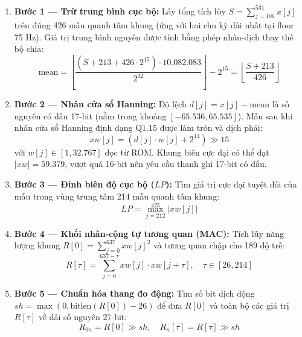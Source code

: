 \begin{enumerate}[leftmargin=1.5em, itemsep=3pt]
    \item \textbf{Bước 1 --- Trừ trung bình cục bộ:} Lấy tổng tích lũy $S = \sum_{j=106}^{531} x[j]$ trên đúng 426 mẫu quanh tâm khung (ứng với hai chu kỳ dài nhất tại floor 75 Hz). Giá trị trung bình nguyên được tính bằng phép nhân-dịch thay thế bộ chia:
    \begin{equation}
        \text{mean} = \left\lfloor \frac{(S + 213 + 426 \cdot 2^{15}) \cdot 10.082.083}{2^{32}} \right\rfloor - 2^{15} = \left\lfloor \frac{S + 213}{426} \right\rfloor
    \end{equation}
    
    \item \textbf{Bước 2 --- Nhân cửa sổ Hanning:} Độ lệch $d[j] = x[j] - \text{mean}$ là số nguyên có dấu 17-bit (nằm trong khoảng $[-65.536, 65.535]$). Mẫu sau khi nhân cửa sổ Hanning định dạng Q1.15 được làm tròn và dịch phải:
    \begin{equation}
        xw[j] = (d[j] \cdot w[j] + 2^{14}) \gg 15
    \end{equation}
    với $w[j] \in [1, 32.767]$ đọc từ ROM. Khung biên cực đại có thể đạt $|xw| = 59.379$, vượt quá 16-bit nên yêu cầu thanh ghi 17-bit có dấu.
    
    \item \textbf{Bước 3 --- Đỉnh biên độ cục bộ ($LP$):} Tìm giá trị cực đại tuyệt đối của mẫu trong vùng trung tâm 214 mẫu quanh tâm khung:
    \begin{equation}
        LP = \max_{j=212}^{425} |xw[j]|
    \end{equation}
    
    \item \textbf{Bước 4 --- Khối nhân-cộng tự tương quan (MAC):} Tích lũy năng lượng khung $R[0] = \sum_{j=0}^{637} xw[j]^2$ và tương quan chập cho 189 độ trễ:
    \begin{equation}
        R[\tau] = \sum_{j=0}^{637-\tau} xw[j] \cdot xw[j+\tau], \quad \tau \in [26, 214]
    \end{equation}
    
    \item \textbf{Bước 5 --- Chuẩn hóa thang đo động:} Tìm số bit dịch động $sh = \max(0, \text{bitlen}(R[0]) - 26)$ để đưa $R[0]$ và toàn bộ các giá trị $R[\tau]$ về dải số nguyên 27-bit:
    \begin{equation}
        R_{0n} = R[0] \gg sh, \quad R_n[\tau] = R[\tau] \gg sh
    \end{equation}
    

\end{enumerate}
